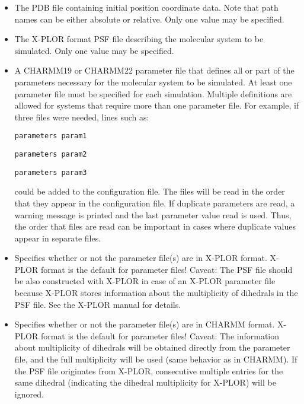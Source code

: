 \begin{itemize}
\item
{}
{\label{param:coordinates}
The PDB file containing initial position coordinate data.  
Note that path names can be either absolute or relative.  
Only one value may be specified.}

\item
{}
{\label{param:structure}
The X-PLOR format PSF file describing the molecular 
system to be simulated.  
Only one value may be specified.}

\item
{}
{\label{param:parameters}
A CHARMM19 or CHARMM22 parameter file that defines all or part 
of the parameters necessary for the molecular system to be simulated.  
At least one parameter file must be specified for each simulation.  
Multiple definitions are allowed for systems that require more 
than one parameter file.  For example, if three files were needed, 
lines such as:

\bigskip

{\tt parameters param1}

{\tt parameters param2}

{\tt parameters param3}

\bigskip

\noindent could be added to the configuration file.  
The files will be read 
in the order that they appear in the configuration file.  If duplicate
parameters are read, a warning message is printed and the last
parameter value read is used.  Thus, the order that files are read 
can be important in cases where duplicate values appear in 
separate files.}

\item
{}
{Specifies whether or not the parameter file(s) are in X-PLOR format.
 X-PLOR format is the default for parameter files!
 Caveat: The PSF file should be also constructed with X-PLOR in
 case of an X-PLOR parameter file because X-PLOR stores information
 about the multiplicity of dihedrals in the PSF file. See the X-PLOR
 manual for details.}

\item
{}
{Specifies whether or not the parameter file(s) are in CHARMM format.
 X-PLOR format is the default for parameter files!
 Caveat: The information about multiplicity of dihedrals will be
 obtained directly from the parameter file, and the full multiplicity
 will be used (same behavior as in CHARMM). If the PSF file originates
 from X-PLOR, consecutive multiple entries for the same dihedral 
 (indicating the dihedral multiplicity for X-PLOR) will be ignored.}


\end{itemize}
